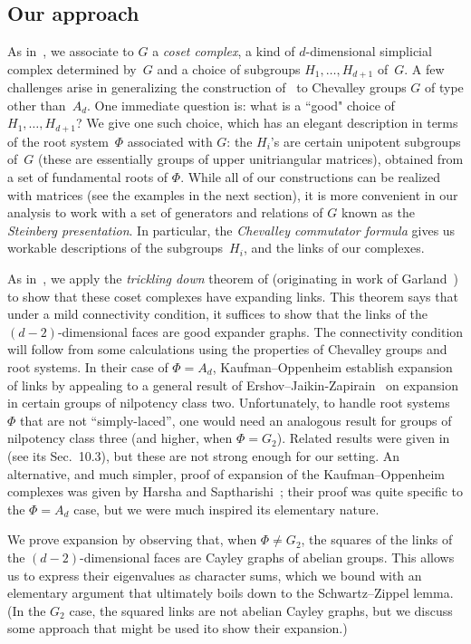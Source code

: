 \documentclass[10pt,a4paper]{article}
\theoremstyle{definition}
\begin{document}
\subsection{Our approach}
As in~\cite{KO18}, we associate to $G$ a \emph{coset complex}, a kind of $d$-dimensional simplicial complex determined by~$G$ and a choice of subgroups $H_1, \ldots, H_{d+1}$ of~$G$.
A few challenges arise in generalizing the construction of~\cite{KO18} to Chevalley groups $G$ of type other than~$A_d$.
One immediate question is: what is a ``good" choice of $H_1, \ldots, H_{d+1}$?
We give one such choice, which has an elegant description in terms of the root system~$\Phi$ associated with $G$: the $H_i$'s are certain unipotent subgroups of~$G$ (these are essentially groups of upper unitriangular matrices), obtained from a set of fundamental roots of $\Phi$. While all of our constructions can be realized with matrices (see the examples in the next section), it is more convenient in our analysis to work with a set of generators and relations of $G$ known as the \emph{Steinberg presentation}. In particular, the \emph{Chevalley commutator formula} gives us workable descriptions of the subgroups~$H_i$, and the links of our complexes.

As in~\cite{KO18}, we apply the \emph{trickling down} theorem of \cite{Opp18} (originating in work of Garland~\cite{Gar73}) to show that these coset complexes have expanding links.
This theorem says that under a mild connectivity condition, it suffices to show that the links of the $(d-2)$-dimensional faces are good expander graphs.
The connectivity condition will follow from some calculations using the properties of Chevalley groups and root systems. In their case of $\Phi = A_d$, Kaufman--Oppenheim establish expansion of links by appealing to a general result of Ershov--Jaikin-Zapirain~\cite{EJ10} on expansion in certain groups of nilpotency class two.
Unfortunately, to handle root systems~$\Phi$ that are not ``simply-laced'', one would need an analogous result for groups of nilpotency class three (and higher, when $\Phi = G_2$).
Related results were given in \cite{EJK17} (see its Sec.~10.3), but these are not strong enough for our setting.
An alternative, and much simpler, proof of expansion of the Kaufman--Oppenheim complexes was given by Harsha and Saptharishi~\cite{HS19}; their proof was quite specific to the $\Phi = A_d$ case, but we were much inspired its elementary nature.

We prove expansion by observing that, when $\Phi \neq G_2$, the squares of the links of the $(d-2)$-dimensional faces are Cayley graphs of abelian groups. This allows us to express their eigenvalues as character sums, which we bound with an elementary argument that ultimately boils down to the Schwartz--Zippel lemma.  (In the $G_2$ case, the squared links are not abelian Cayley graphs, but we discuss some approach that might be used ito show their expansion.)
\end{document}

